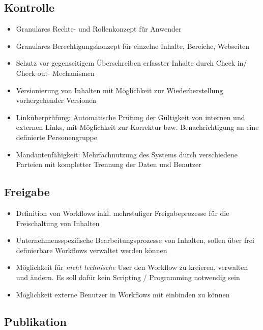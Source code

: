 
\subsection{Kontrolle}


\begin{itemize}
\item
Granulares Rechte- und Rollenkonzept für Anwender
\item
Granulares Berechtigungskonzept für einzelne Inhalte, Bereiche, Webseiten
\item
Schutz vor gegenseitigem Überschreiben erfasster Inhalte durch Check in/ Check out- Mechanismen
\item
Versionierung von Inhalten mit Möglichkeit zur Wiederherstellung vorhergehender Versionen
\item
Linküberprüfung: Automatische Prüfung der Gültigkeit von internen und externen Links, mit Möglichkeit zur Korrektur bzw. Benachrichtigung an eine definierte Personengruppe
\item
Mandantenfähigkeit: Mehrfachnutzung des Systems durch verschiedene Parteien mit kompletter Trennung der Daten und Benutzer
\end{itemize}


\subsection{Freigabe}

\begin{itemize}
\item
Definition von Workflows inkl. mehrstufiger Freigabeprozesse für die Freischaltung von Inhalten
\item
Unternehmensspezifische Bearbeitungsprozesse von Inhalten, sollen über frei definierbare Workflows verwaltet werden können
\item
Möglichkeit für \emph{nicht technische} User den Workflow zu kreieren, verwalten und ändern. Es soll dafür kein Scripting / Programming notwendig sein
\item
Möglichkeit externe Benutzer in Workflows mit einbinden zu können
\end{itemize}



\subsection{Publikation}

